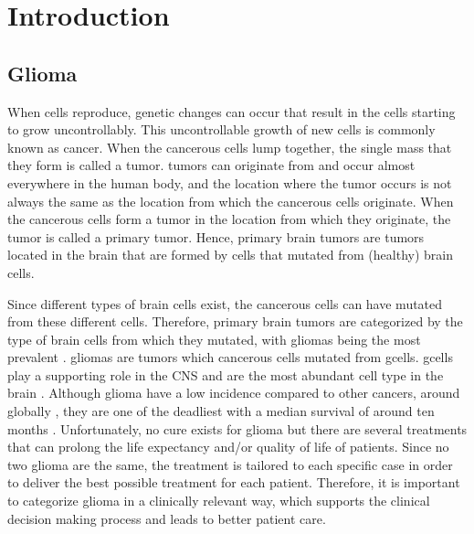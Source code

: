 
\chapter{Introduction}
\section{Glioma}

When cells reproduce, genetic changes can occur that result in the cells starting to grow uncontrollably.
This uncontrollable growth of new cells is commonly known as cancer.
When the cancerous cells lump together, the single mass that they form is called a \gls{tumor}.
\Glspl{tumor} can originate from and occur almost everywhere in the human body, and the location where the \gls{tumor} occurs is not always the same as the location from which the cancerous cells originate.
When the cancerous cells form a \gls{tumor} in the location from which they originate, the \gls{tumor} is called a primary \gls{tumor}.
Hence, primary brain \glspl{tumor} are \glspl{tumor} located in the brain that are formed by cells that mutated from (healthy) brain cells.

Since different types of brain cells exist, the cancerous cells can have mutated from these different cells.
Therefore, primary brain \glspl{tumor} are categorized by the type of brain cells from which they mutated, with \glspl{glioma} being the most prevalent \autocite{leece2017indicence}.
\Glspl{glioma} are \glspl{tumor} which cancerous cells mutated from \glspl{gcell}.
\Glspl{gcell} play a supporting role in the \acrlong{CNS} and are the most abundant cell type in the brain \autocite{jakel2017glial}.
Although \gls{glioma} have a low incidence compared to other cancers, around  globally \autocite{leece2017indicence}, they are one of the deadliest with a median survival of around ten months \autocite{hess2004gliomaincidence}.
Unfortunately, no cure exists for \gls{glioma} but there are several treatments that can prolong the life expectancy and/or quality of life of patients.
Since no two \gls{glioma} are the same, the treatment is tailored to each specific case in order to deliver the best possible treatment for each patient.
Therefore, it is important to categorize \gls{glioma} in a clinically relevant way, which supports the clinical decision making process and leads to better patient care.

